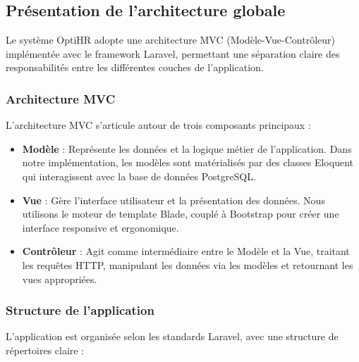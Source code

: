 \subsection{Présentation de l'architecture globale}

Le système OptiHR adopte une architecture MVC (Modèle-Vue-Contrôleur)
implémentée avec le framework Laravel, permettant une séparation claire des
responsabilités entre les différentes couches de l'application.

\subsubsection{Architecture MVC}
L'architecture MVC s'articule autour de trois composants principaux :

\begin{itemize}
    \item \textbf{Modèle} : Représente les données et la logique métier de l'application. Dans notre implémentation, les modèles sont matérialisés par des classes Eloquent qui interagissent avec la base de données PostgreSQL.

    \item \textbf{Vue} : Gère l'interface utilisateur et la présentation des données. Nous utilisons le moteur de template Blade, couplé à Bootstrap pour créer une interface responsive et ergonomique.

    \item \textbf{Contrôleur} : Agit comme intermédiaire entre le Modèle et la Vue, traitant les requêtes HTTP, manipulant les données via les modèles et retournant les vues appropriées.
\end{itemize}

\subsubsection{Structure de l'application}
L'application est organisée selon les standards Laravel, avec une structure de
répertoires claire :

